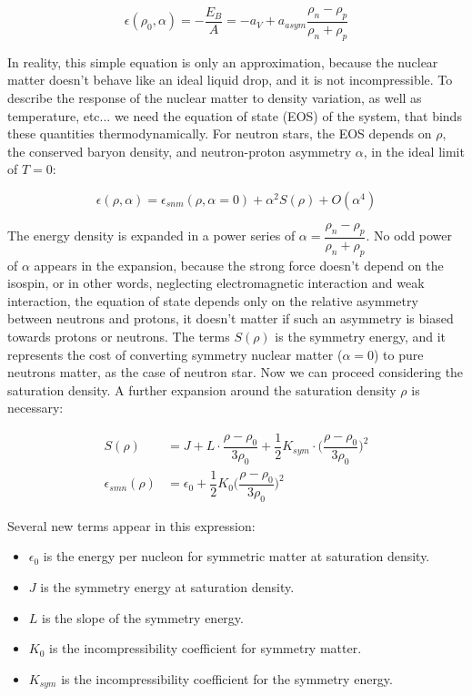 \begin{equation}
\epsilon (\rho_{0}, \alpha) = -\frac{E_{B}}{A} = -a_{V} + a_{asym} \dfrac{\rho_{n} - \rho_{p}}{\rho_{n} + \rho_{p}}
\end{equation}

In reality, this simple equation is only an approximation, because the nuclear matter doesn't behave like an ideal liquid drop, and it is not incompressible. To describe the response of the nuclear matter to density variation, as well as temperature, etc... we need the equation of state (EOS) of the system, that binds these quantities thermodynamically. For neutron stars, the EOS depends on $\rho$, the conserved baryon density, and neutron-proton asymmetry $\alpha$, in the ideal limit of $T = 0$:

\begin{equation}
\epsilon (\rho,\alpha) = \epsilon_{snm} (\rho, \alpha = 0) + \alpha ^{2} S(\rho) + O(\alpha ^{4})
\end{equation}

The energy density is expanded in a power series of $\alpha = \dfrac{\rho_{n} - \rho_{p}}{\rho_{n} + \rho_{p}}$. No odd power of $\alpha$ appears in the expansion, because the strong force doesn't depend on the isospin, or in other words, neglecting electromagnetic interaction and weak interaction, the equation of state depends only on the relative asymmetry between neutrons and protons, it doesn't matter if such an asymmetry is biased towards protons or neutrons.
The terms $S(\rho)$ is the symmetry energy, and it represents the cost of converting symmetry nuclear matter ($\alpha = 0$) to pure neutrons matter, as the case of neutron star. Now we can proceed considering the saturation density. A further expansion around the saturation density $\rho$ is necessary:
	
\begin{equation}
\begin{split}
S(\rho) &= J + L \cdot \dfrac{\rho - \rho_{0}}{3 \rho_{0}} + \dfrac{1}{2} K_{sym} \cdot \biggl(\dfrac{\rho - \rho_{0}}{3 \rho_{0}}\biggl)^{2} \\
\epsilon _{smn} (\rho) &= \epsilon_{0} + \dfrac{1}{2}K_{0} \biggl(\dfrac{\rho - \rho_{0}}{3 \rho_{0}} \biggl)^{2} 
\end{split}
\end{equation}

Several new terms appear in this expression:
\begin{itemize}
\item $\epsilon_{0}$ is the energy per nucleon for symmetric matter at saturation density.
\item $J$ is the symmetry energy at saturation density.
\item $L$ is the slope of the symmetry energy.
\item $K_{0}$ is the incompressibility coefficient for symmetry matter. 
\item $K_{sym}$ is the incompressibility coefficient for the symmetry energy.
\end{itemize}

